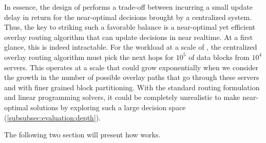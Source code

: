In essence, the design of \name performs a trade-off between incurring
a small update delay in return for the near-optimal
decisions brought by a centralized system. Thus, the key to striking such a
favorable balance is a near-optimal yet efficient overlay routing
algorithm that can update decisions in near realtime. At a first
glance, this is indeed intractable. For the workload at a scale of
\company, the centralized overlay routing algorithm must pick the next
hops for $10^5$ of data blocks from $10^4$ servers. This operates at a scale that
could grow exponentially when we consider the growth in the number of possible
overlay paths that go through these servers and with finer grained
block partitioning. With the standard routing formulation and linear
programming solvers, it could be completely unrealistic to make
near-optimal solutions by exploring such a large decision space
(\Section\ref{subsubsec:evaluation:depth}).


The following two section will present how \name works.

